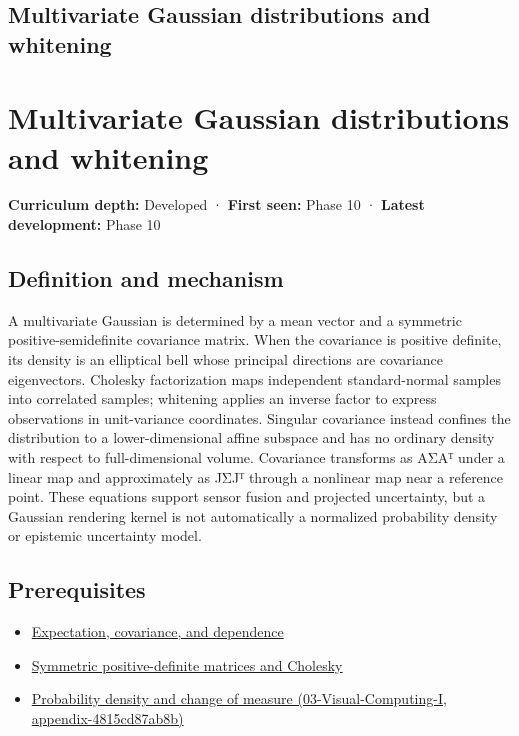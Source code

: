 \hypertarget{appendix-12bbe185dbe5}{}
\section*{Multivariate Gaussian distributions and whitening}
\chapter{Multivariate Gaussian distributions and whitening}\label{appendix-12bbe185dbe5-multivariate-gaussian-distributions-and-whitening}

\textbf{Curriculum depth:} Developed · \textbf{First seen:} Phase 10 · \textbf{Latest development:} Phase 10

\section{Definition and mechanism}\label{appendix-12bbe185dbe5-definition-and-mechanism}

A multivariate Gaussian is determined by a mean vector and a symmetric positive-semidefinite covariance matrix. When the covariance is positive definite, its density is an elliptical bell whose principal directions are covariance eigenvectors. Cholesky factorization maps independent standard-normal samples into correlated samples; whitening applies an inverse factor to express observations in unit-variance coordinates. Singular covariance instead confines the distribution to a lower-dimensional affine subspace and has no ordinary density with respect to full-dimensional volume. Covariance transforms as AΣAᵀ under a linear map and approximately as JΣJᵀ through a nonlinear map near a reference point. These equations support sensor fusion and projected uncertainty, but a Gaussian rendering kernel is not automatically a normalized probability density or epistemic uncertainty model.

\section{Prerequisites}\label{appendix-12bbe185dbe5-prerequisites}

\begin{itemize}
\tightlist
\item
  \hyperref[appendix-54c383df9992]{Expectation, covariance, and dependence}
\item
  \hyperref[appendix-50d2ea3c9b26]{Symmetric positive-definite matrices and Cholesky}
\item
  \href{../03-Visual-Computing-I/main.pdf\#nameddest=appendix-4815cd87ab8b}{Probability density and change of measure (03-Visual-Computing-I, appendix-4815cd87ab8b)}
\end{itemize}

